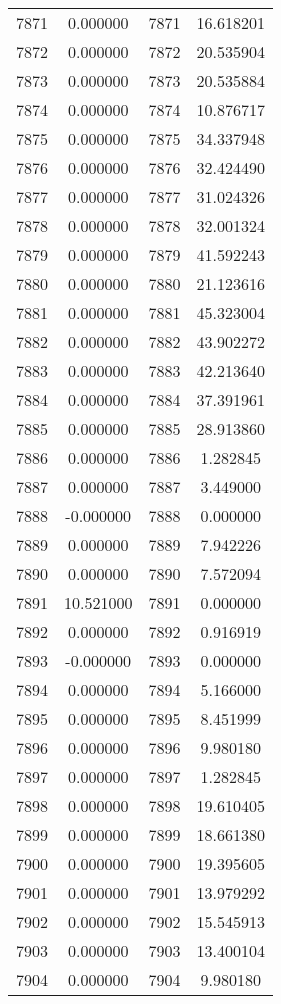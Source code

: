 \documentclass[12pt]{article}
\begin{document}
\begin{longtable}{@{}cccc@{}}
7871 & 0.000000 & 7871 & 16.618201 \\
7872 & 0.000000 & 7872 & 20.535904 \\
7873 & 0.000000 & 7873 & 20.535884 \\
7874 & 0.000000 & 7874 & 10.876717 \\
7875 & 0.000000 & 7875 & 34.337948 \\
7876 & 0.000000 & 7876 & 32.424490 \\
7877 & 0.000000 & 7877 & 31.024326 \\
7878 & 0.000000 & 7878 & 32.001324 \\
7879 & 0.000000 & 7879 & 41.592243 \\
7880 & 0.000000 & 7880 & 21.123616 \\
7881 & 0.000000 & 7881 & 45.323004 \\
7882 & 0.000000 & 7882 & 43.902272 \\
7883 & 0.000000 & 7883 & 42.213640 \\
7884 & 0.000000 & 7884 & 37.391961 \\
7885 & 0.000000 & 7885 & 28.913860 \\
7886 & 0.000000 & 7886 & 1.282845 \\
7887 & 0.000000 & 7887 & 3.449000 \\
7888 & -0.000000 & 7888 & 0.000000 \\
7889 & 0.000000 & 7889 & 7.942226 \\
7890 & 0.000000 & 7890 & 7.572094 \\
7891 & 10.521000 & 7891 & 0.000000 \\
7892 & 0.000000 & 7892 & 0.916919 \\
7893 & -0.000000 & 7893 & 0.000000 \\
7894 & 0.000000 & 7894 & 5.166000 \\
7895 & 0.000000 & 7895 & 8.451999 \\
7896 & 0.000000 & 7896 & 9.980180 \\
7897 & 0.000000 & 7897 & 1.282845 \\
7898 & 0.000000 & 7898 & 19.610405 \\
7899 & 0.000000 & 7899 & 18.661380 \\
7900 & 0.000000 & 7900 & 19.395605 \\
7901 & 0.000000 & 7901 & 13.979292 \\
7902 & 0.000000 & 7902 & 15.545913 \\
7903 & 0.000000 & 7903 & 13.400104 \\
7904 & 0.000000 & 7904 & 9.980180 \\

\end{longtable}
\end{document}
